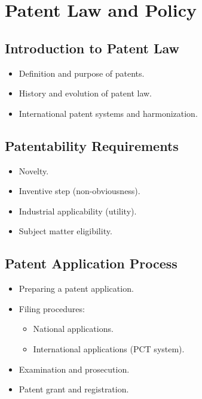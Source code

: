 \chapter{Patent Law and Policy}

\section{Introduction to Patent Law}
\begin{itemize}
    \item Definition and purpose of patents.
    \item History and evolution of patent law.
    \item International patent systems and harmonization.
\end{itemize}

\section{Patentability Requirements}
\begin{itemize}
    \item Novelty.
    \item Inventive step (non-obviousness).
    \item Industrial applicability (utility).
    \item Subject matter eligibility.
\end{itemize}

\section{Patent Application Process}
\begin{itemize}
    \item Preparing a patent application.
    \item Filing procedures:
    \begin{itemize}
        \item National applications.
        \item International applications (PCT system).
    \end{itemize}
    \item Examination and prosecution.
    \item Patent grant and registration.
\end{itemize}

